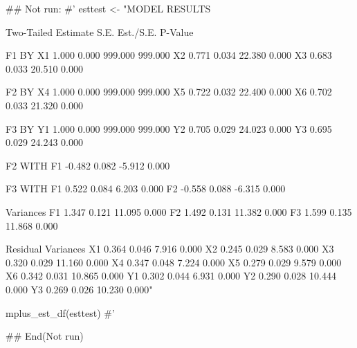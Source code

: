 \documentclass[a4paper]{book}
\begin{document}
\begin{Examples}
\begin{ExampleCode}


## Not run: 
#'
esttest <- "MODEL RESULTS

                                                    Two-Tailed
                    Estimate       S.E.  Est./S.E.    P-Value

 F1       BY
    X1                 1.000      0.000    999.000    999.000
    X2                 0.771      0.034     22.380      0.000
    X3                 0.683      0.033     20.510      0.000

 F2       BY
    X4                 1.000      0.000    999.000    999.000
    X5                 0.722      0.032     22.400      0.000
    X6                 0.702      0.033     21.320      0.000

 F3       BY
    Y1                 1.000      0.000    999.000    999.000
    Y2                 0.705      0.029     24.023      0.000
    Y3                 0.695      0.029     24.243      0.000

 F2       WITH
    F1                -0.482      0.082     -5.912      0.000

 F3       WITH
    F1                 0.522      0.084      6.203      0.000
    F2                -0.558      0.088     -6.315      0.000

 Variances
    F1                 1.347      0.121     11.095      0.000
    F2                 1.492      0.131     11.382      0.000
    F3                 1.599      0.135     11.868      0.000

 Residual Variances
    X1                 0.364      0.046      7.916      0.000
    X2                 0.245      0.029      8.583      0.000
    X3                 0.320      0.029     11.160      0.000
    X4                 0.347      0.048      7.224      0.000
    X5                 0.279      0.029      9.579      0.000
    X6                 0.342      0.031     10.865      0.000
    Y1                 0.302      0.044      6.931      0.000
    Y2                 0.290      0.028     10.444      0.000
    Y3                 0.269      0.026     10.230      0.000"

mplus_est_df(esttest)
#'

## End(Not run)

\end{ExampleCode}
\end{Examples}
\end{document}
